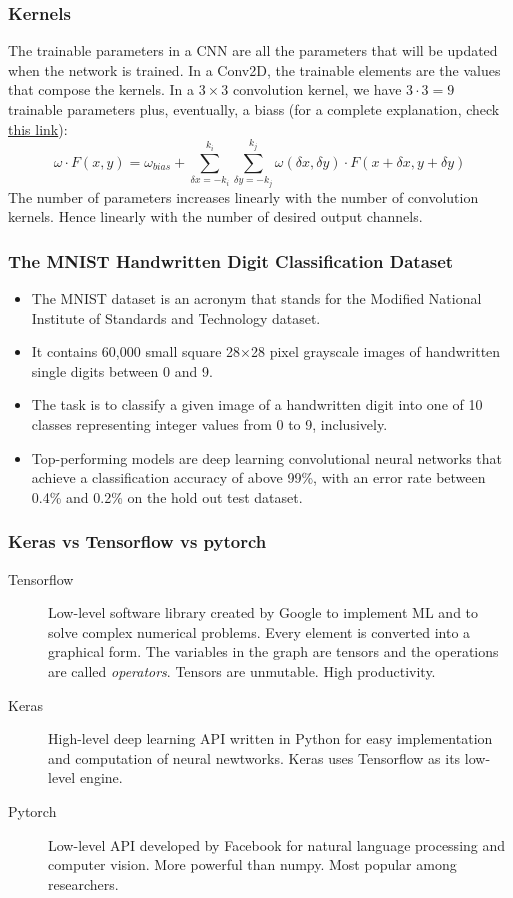 \documentclass{beamer}
\begin{document}
\begin{frame}
    \frametitle{Kernels}

    The trainable parameters in a CNN are all the parameters that will be updated when the network is trained. In a Conv2D, the trainable elements are the values that compose the kernels. In a $3\times 3$ convolution kernel, we have $3\cdot 3=9$ trainable parameters plus, eventually, a biass (for a complete explanation, check \href{https://towardsdatascience.com/conv2d-to-finally-understand-what-happens-in-the-forward-pass-1bbaafb0b148}{this link}):
    \[
    \omega\cdot F(x,y)= \omega_{bias}+\sum_{\delta x=-k_i}^{k_i}  \sum_{\delta y=-k_j}^{k_j}
    \omega(\delta x,\delta y)\cdot F(x+\delta x,y + \delta y)
    \]
    The number of parameters increases linearly with the number of convolution kernels. Hence linearly with the number of desired output channels. 

\end{frame}


\begin{frame}
    \frametitle{The MNIST Handwritten Digit Classification Dataset}
    \begin{itemize}
        \item The MNIST dataset is an acronym that stands for the Modified National Institute of Standards and Technology dataset.
        \item It contains 60,000 small square 28×28 pixel grayscale images of handwritten single digits between 0 and 9.
        \item The task is to classify a given image of a handwritten digit into one of 10 classes representing integer values from 0 to 9, inclusively.
        \item  Top-performing models are deep learning convolutional neural networks that achieve a classification accuracy of above 99\%, with an error rate between 0.4\% and 0.2\% on the hold out test dataset.
    \end{itemize}
\end{frame}

\begin{frame}
    \frametitle{Keras vs Tensorflow vs pytorch}
    \begin{description}
        \item[Tensorflow] Low-level software library created by Google to implement ML and to solve complex numerical problems. Every element is converted into a graphical form. The variables in the graph are tensors and the operations are called {\em operators}. Tensors are unmutable. High productivity.
        \item[Keras] High-level deep learning API written in Python for easy implementation and computation of neural newtworks. Keras uses Tensorflow as its low-level engine.
        \item[Pytorch] Low-level API developed by Facebook for natural language processing and computer vision. More powerful than numpy. Most popular among researchers.
    \end{description}
\end{frame}
\end{document}
